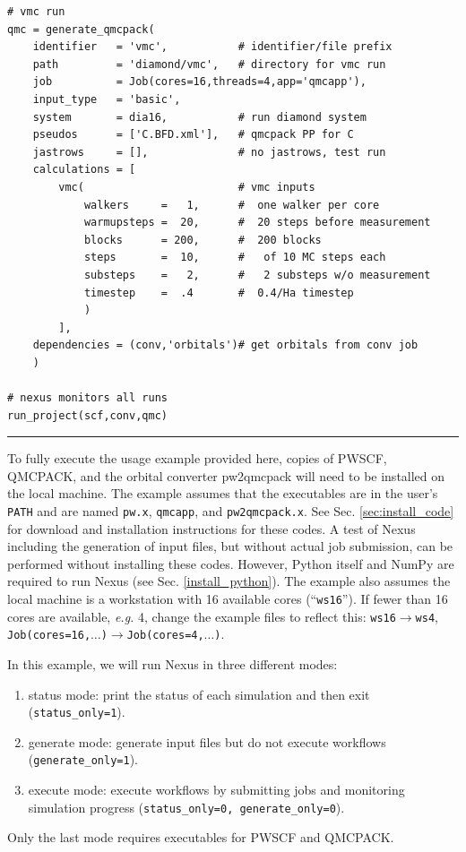 \documentclass[oneside,11pt]{memoir}
\numberwithin{equation}{section}
\newcommand{\HRule}{\rule{\linewidth}{0.5mm}}
\begin{document}
\begin{verbatim}
# vmc run
qmc = generate_qmcpack(
    identifier   = 'vmc',           # identifier/file prefix 
    path         = 'diamond/vmc',   # directory for vmc run
    job          = Job(cores=16,threads=4,app='qmcapp'),
    input_type   = 'basic',
    system       = dia16,           # run diamond system
    pseudos      = ['C.BFD.xml'],   # qmcpack PP for C
    jastrows     = [],              # no jastrows, test run
    calculations = [
        vmc(                        # vmc inputs
            walkers     =   1,      #  one walker per core
            warmupsteps =  20,      #  20 steps before measurement
            blocks      = 200,      #  200 blocks
            steps       =  10,      #   of 10 MC steps each
            substeps    =   2,      #   2 substeps w/o measurement
            timestep    =  .4       #  0.4/Ha timestep
            )
        ],
    dependencies = (conv,'orbitals')# get orbitals from conv job
    )

# nexus monitors all runs
run_project(scf,conv,qmc)
\end{verbatim}
\HRule


To fully execute the usage example provided here, copies of PWSCF, QMCPACK, and the orbital converter pw2qmcpack will need to be installed on the local machine.  The example assumes that the executables are in the user's \texttt{PATH} and are named \texttt{pw.x}, \texttt{qmcapp}, and \texttt{pw2qmcpack.x}.  See Sec. \ref{sec:install_code} for download and installation instructions for these codes. A test of Nexus including the generation of input files, but without actual job submission, can be performed without installing these codes.  However, Python itself and NumPy are required to run Nexus (see Sec. \ref{install_python}).    The example also assumes the local machine is a workstation with 16 available cores (``\texttt{ws16}'').  If fewer than 16 cores are available, \emph{e.g.} 4, change the example files to reflect this: \texttt{ws16}$\rightarrow$\texttt{ws4}, \texttt{Job(cores=16,$\ldots$)}$\rightarrow$\texttt{Job(cores=4,$\ldots$)}. 

In this example, we will run Nexus in three different modes:
\begin{enumerate}
  \item{status mode: print the status of each simulation and then exit (\texttt{status\_only=1}).}
  \item{generate mode: generate input files but do not execute workflows (\texttt{generate\_only=1}).}
  \item{execute mode: execute workflows by submitting jobs and monitoring simulation progress (\texttt{status\_only=0, generate\_only=0}).}
\end{enumerate}
Only the last mode requires executables for PWSCF and QMCPACK.
\end{document}
